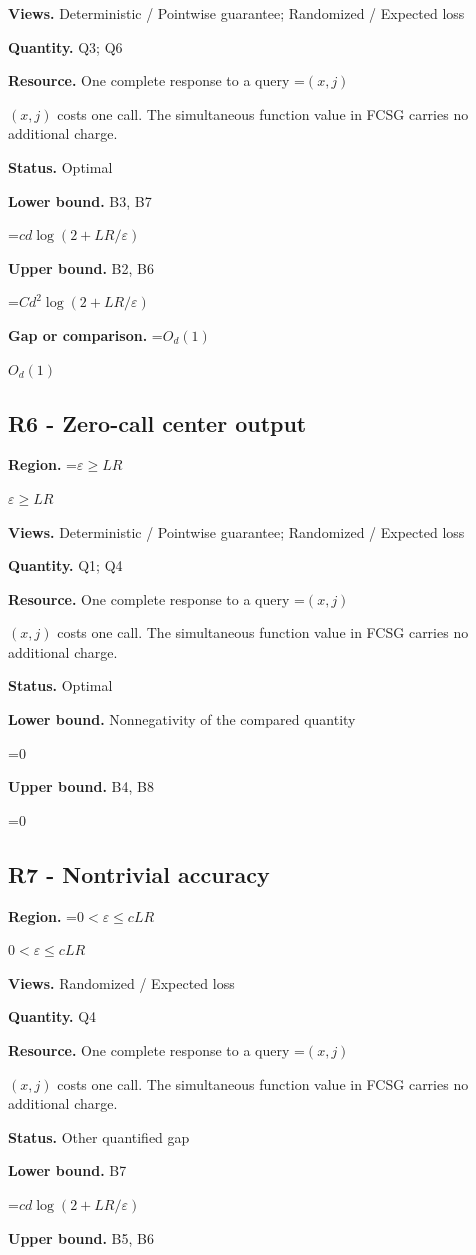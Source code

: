 \documentclass[10pt,a4paper]{article}
\newcommand{\AtlasMath}[1]{\par\begingroup\centering\setbox0=\hbox{$\displaystyle #1$}\ifdim\wd0>1.4\linewidth\typeout{ATLAS WIDE FORMULA: \the\wd0}\fi\ifdim\wd0>\linewidth\resizebox{\linewidth}{!}{\box0}\else\box0\fi\par\endgroup}
\newcommand{\AtlasInlineMath}[1]{\begingroup\setbox0=\hbox{$#1$}\ifdim\wd0>.4\linewidth\endgroup\AtlasMath{#1}\else\endgroup$#1$\fi}
\begin{document}
\textbf{Views.} Deterministic / Pointwise guarantee; Randomized / Expected loss

\textbf{Quantity.} Q3; Q6

\textbf{Resource.} One complete response to a query \AtlasInlineMath{(x,j)} costs one call. The simultaneous function value in FCSG carries no additional charge.

\textbf{Status.} Optimal

\textbf{Lower bound.} B3, B7

\AtlasMath{cd\log(2+LR/\varepsilon)}
\textbf{Upper bound.} B2, B6

\AtlasMath{Cd^2\log(2+LR/\varepsilon)}
\textbf{Gap or comparison.} \AtlasInlineMath{O_d(1)}

\subsection{R6 - Zero-call center output}
\textbf{Region.} \AtlasInlineMath{\varepsilon\ge LR}

\textbf{Views.} Deterministic / Pointwise guarantee; Randomized / Expected loss

\textbf{Quantity.} Q1; Q4

\textbf{Resource.} One complete response to a query \AtlasInlineMath{(x,j)} costs one call. The simultaneous function value in FCSG carries no additional charge.

\textbf{Status.} Optimal

\textbf{Lower bound.} Nonnegativity of the compared quantity

\AtlasMath{0}
\textbf{Upper bound.} B4, B8

\AtlasMath{0}
\subsection{R7 - Nontrivial accuracy}
\textbf{Region.} \AtlasInlineMath{0<\varepsilon\le cLR}

\textbf{Views.} Randomized / Expected loss

\textbf{Quantity.} Q4

\textbf{Resource.} One complete response to a query \AtlasInlineMath{(x,j)} costs one call. The simultaneous function value in FCSG carries no additional charge.

\textbf{Status.} Other quantified gap

\textbf{Lower bound.} B7

\AtlasMath{cd\log(2+LR/\varepsilon)}
\textbf{Upper bound.} B5, B6
\end{document}
